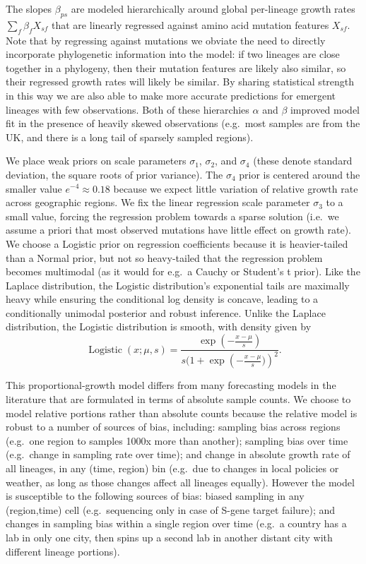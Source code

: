 \documentclass[12pt]{article}
\begin{document}
The slopes $\beta_{ps}$ are modeled hierarchically around global per-lineage growth rates $\sum_f \beta_f X_{sf}$ that are linearly regressed against amino acid mutation features $X_{sf}$.
Note that by regressing against mutations we obviate the need to directly incorporate phylogenetic information into the model: if two lineages are close together in a phylogeny, then their mutation features are likely also similar, so their regressed growth rates will likely be similar.
By sharing statistical strength in this way we are also able to make more accurate predictions for emergent lineages with few observations.
Both of these hierarchies $\alpha$ and $\beta$ improved model fit in the presence of heavily skewed observations (e.g.~most samples are from the UK, and there is a long tail of sparsely sampled regions).

We place weak priors on scale parameters $\sigma_1$, $\sigma_2$, and $\sigma_4$ (these denote standard deviation, the square roots of prior variance).
The $\sigma_4$ prior is centered around the smaller value $e^{-4}\approx 0.18$ because we expect little variation of relative growth rate across geographic regions.
We fix the linear regression scale parameter $\sigma_3$ to a small value, forcing the regression problem towards a sparse solution (i.e.~we assume a priori that most observed mutations have little effect on growth rate).
We choose a Logistic prior on regression coefficients because it is heavier-tailed than a Normal prior, but not so heavy-tailed that the regression problem becomes multimodal (as it would for e.g.~a Cauchy or Student's t prior).
Like the Laplace distribution, the Logistic distribution's exponential tails are maximally heavy while ensuring the conditional log density is concave, leading to a conditionally unimodal posterior and robust inference.
Unlike the Laplace distribution, the Logistic distribution is smooth, with density given by
$$
\operatorname{Logistic}(x;\mu,s) = \frac
    {\exp(-\frac{x-\mu}s)}
    {s(1 + \exp\left(-\frac{x-\mu}s)\right)^2}.
$$

This proportional-growth model differs from many forecasting models in the literature that are formulated in terms of absolute sample counts.
We choose to model relative portions rather than absolute counts because the relative model is robust to a number of sources of bias, including:
sampling bias across regions (e.g.~one region to samples 1000x more than another);
sampling bias over time (e.g.~change in sampling rate over time); and
change in absolute growth rate of all lineages, in any (time, region) bin (e.g.~due to changes in local policies or weather, as long as those changes affect all lineages equally).
However the model is susceptible to the following sources of bias:
biased sampling in any (region,time) cell (e.g.~sequencing only in case of S-gene target failure); and changes in sampling bias within a single region over time (e.g.~a country has a lab in only one city, then spins up a second lab in another distant city with different lineage portions).
\end{document}
